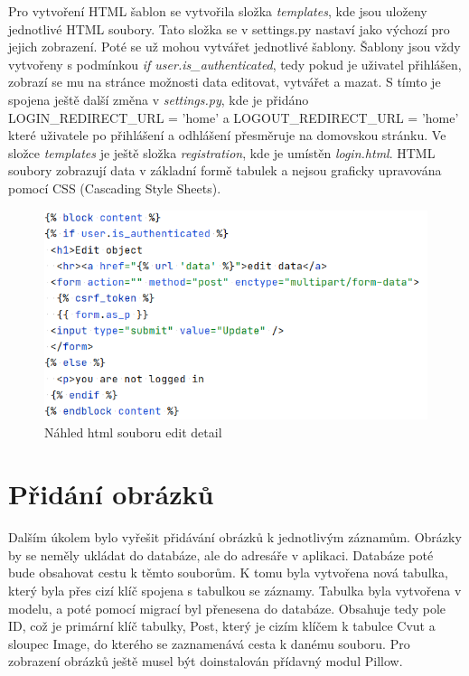 Pro vytvoření HTML šablon se vytvořila složka \emph{templates}, kde
jsou uloženy jednotlivé HTML soubory. Tato složka se v settings.py
nastaví jako výchozí pro jejich zobrazení. Poté se už mohou vytvářet
jednotlivé šablony. Šablony jsou vždy vytvořeny s podmínkou \emph{if
  user.is\_authenticated}, tedy pokud je uživatel přihlášen, zobrazí
se mu na stránce možnosti data editovat, vytvářet a mazat. S tímto je
spojena ještě další změna v \emph{settings.py}, kde je přidáno
LOGIN\_REDIRECT\_URL = 'home' a LOGOUT\_REDIRECT\_URL
  = 'home' které uživatele po přihlášení a odhlášení přesměruje na
domovskou stránku. Ve složce \emph{templates} je ještě složka
\emph{registration}, kde je umístěn \emph{login.html}. HTML soubory
zobrazují data v základní formě tabulek a nejsou graficky upravována
pomocí CSS (Cascading Style Sheets).

\begin{figure}[H] \centering
    \includegraphics[width=350pt]{./pictures/8-edit-detail-html.PNG}
    \caption[Náhled html souboru edit detail]{Náhled html souboru edit detail}
	\label{fig:Náhled HTML souboru edit detail}
\end{figure}


\newpage

\section{Přidání obrázků}

Dalším úkolem bylo vyřešit přidávání obrázků k jednotlivým
záznamům. Obrázky by se neměly ukládat do databáze, ale do adresáře v
aplikaci. Databáze poté bude obsahovat cestu k těmto souborům. K tomu
byla vytvořena nová tabulka, který byla přes cizí klíč spojena s
tabulkou se záznamy. Tabulka byla vytvořena v modelu, a poté pomocí
migrací byl přenesena do databáze. Obsahuje tedy pole ID, což je
primární klíč tabulky, Post, který je cizím klíčem k tabulce Cvut a
sloupec Image, do kterého se zaznamenává cesta k danému souboru.
Pro zobrazení obrázků ještě musel být doinstalován přídavný modul Pillow. \cite{chaiken}


